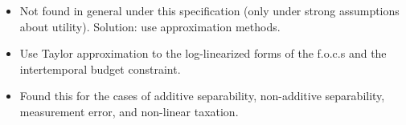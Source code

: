 \documentclass[notes=show]{beamer}
\begin{document}
\begin{frame}%



\begin{itemize}
\item Not found in general under this specification (only under strong
assumptions about utility). Solution: use approximation methods.

\item Use Taylor approximation to the log-linearized forms of the f.o.c.s
and the intertemporal budget constraint.

\item Found this for the cases of additive separability, non-additive
separability, measurement error, and non-linear taxation.
\end{itemize}

\transboxout%
\end{frame}%

\bigskip
\end{document}

